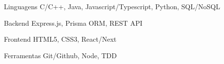 

\begin{cvskills}

  \cvskill
    {Linguagens} %
    {C/C++, Java, Javascript/Typescript, Python, SQL/NoSQL} %

  \cvskill
    {Backend} %
    {Express.js, Prisma ORM, REST API} %

  \cvskill
    {Frontend} %
    {HTML5, CSS3, React/Next} %

  \cvskill
    {Ferramentas} %
    {Git/Github, Node, TDD} %
    
\end{cvskills}
